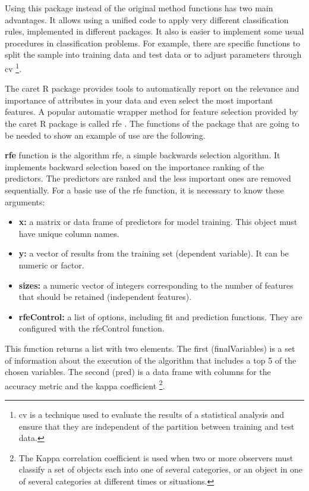 Using this package instead of the original method functions has two main advantages. It allows using a unified code to apply very different classification rules, implemented in different packages. It also is easier to implement some usual procedures in classification problems. For example, there are specific functions to split the sample into training data and test data or to adjust parameters through \acrlong{cv} \footnote{\acrfull{cv} is a technique used to evaluate the results of a statistical analysis and ensure that they are independent of the partition between training and test data.}.

The \acrshort{caret} R package provides tools to automatically report on the relevance and importance of attributes in your data and even select the most important features. A popular automatic wrapper method for feature selection provided by the caret R package is called \acrfull{rfe} \cite{fs-caret}. The functions of the package that are going to be needed to show an example of use are the following.

\textbf{rfe} function is the algorithm \acrshort{rfe}, a simple backwards selection algorithm. It implements backward selection based on the importance ranking of the predictors. The predictors are ranked and the less important ones are removed sequentially. For a basic use of the rfe function, it is necessary to know these arguments:

\begin{itemize}
    \item \textbf{x:} a matrix or data frame of predictors for model training. This object must have unique column names.
    
    \item \textbf{y:} a vector of results from the training set (dependent variable). It can be numeric or factor.
    
    \item \textbf{sizes:} a numeric vector of integers corresponding to the number of features that should be retained (independent features).
    
    \item \textbf{rfeControl:} a list of options, including fit and prediction functions. They are configured with the rfeControl function.
\end{itemize}

This function returns a list with two elements. The first (finalVariables) is a set of information about the execution of the algorithm that includes a top 5 of the chosen variables. The second (pred) is a data frame with columns for the accuracy metric and the kappa coefficient \footnote{The Kappa correlation coefficient is used when two or more observers must classify a set of objects each into one of several categories, or an object in one of several categories at different times or situations.}.

